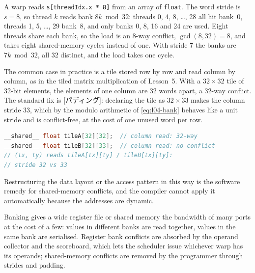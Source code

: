 \documentclass[../main.tex]{subfiles}
\begin{document}
\begin{example}
  \label{ex:l04-smem-stride}
  A warp reads \texttt{s[threadIdx.x * 8]} from an array of
  \texttt{float}.  The word stride is $s = 8$, so thread $k$ reads bank
  $8k \bmod 32$: threads 0, 4, 8, \ldots, 28 all hit bank~0, threads
  1, 5, \ldots, 29 bank~8, and only banks 0, 8, 16 and 24 are used.
  Eight threads share each bank, so the load is an 8-way conflict,
  $\gcd(8, 32) = 8$, and takes eight shared-memory cycles instead of
  one.  With stride 7 the banks are $7k \bmod 32$, all 32 distinct, and
  the load takes one cycle.
\end{example}

The common case in practice is a tile stored row by row and read column
by column, as in the tiled matrix multiplication of Lesson~5.  With a
$32 \times 32$ tile of 32-bit elements, the elements of one column are
32 words apart, a 32-way conflict.  The standard fix is
[パディング]: declaring the tile as $32 \times 33$ makes
the column stride 33, which by the modulo arithmetic of
\cref{eq:l04-bank} behaves like a unit stride and is conflict-free, at
the cost of one unused word per row.
\begin{lstlisting}[language=C++, numbers=none]
__shared__ float tileA[32][32];  // column read: 32-way
__shared__ float tileB[32][33];  // column read: no conflict
// (tx, ty) reads tileA[tx][ty] / tileB[tx][ty]:
// stride 32 vs 33
\end{lstlisting}
Restructuring the data layout or the access pattern in this way is the
software remedy for shared-memory conflicts, and the compiler cannot
apply it automatically because the addresses are dynamic.

\begin{keypoint}
  Banking gives a wide register file or shared memory the bandwidth of
  many ports at the cost of a few: values in different banks are read
  together, values in the same bank are serialised.  Register bank
  conflicts are absorbed by the operand collector and the scoreboard,
  which lets the scheduler issue whichever warp has its operands;
  shared-memory conflicts are removed by the programmer through strides
  and padding.
\end{keypoint}
\end{document}
